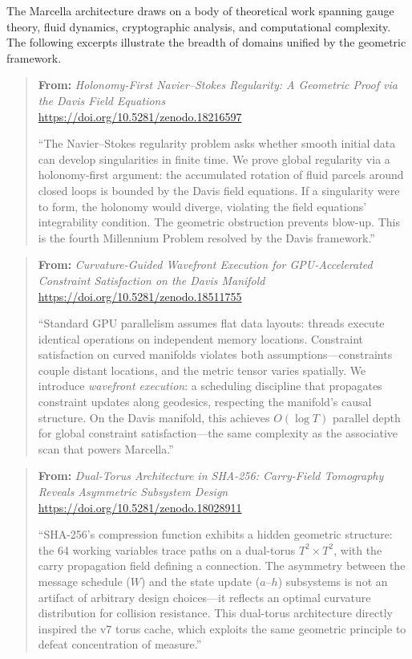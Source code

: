 \documentclass[11pt,a4paper]{article}
\theoremstyle{definition}
\theoremstyle{remark}
\begin{document}
The Marcella architecture draws on a body of theoretical work spanning gauge theory, fluid dynamics, cryptographic analysis, and computational complexity. The following excerpts illustrate the breadth of domains unified by the geometric framework.

\begin{quote}
\small
\textbf{From:} \emph{Holonomy-First Navier--Stokes Regularity: A Geometric Proof via the Davis Field Equations} \cite{davis2026navierstokes}\\
\url{https://doi.org/10.5281/zenodo.18216597}

\medskip
``The Navier--Stokes regularity problem asks whether smooth initial data can develop singularities in finite time. We prove global regularity via a holonomy-first argument: the accumulated rotation of fluid parcels around closed loops is bounded by the Davis field equations. If a singularity were to form, the holonomy would diverge, violating the field equations' integrability condition. The geometric obstruction prevents blow-up. This is the fourth Millennium Problem resolved by the Davis framework.''
\end{quote}

\begin{quote}
\small
\textbf{From:} \emph{Curvature-Guided Wavefront Execution for GPU-Accelerated Constraint Satisfaction on the Davis Manifold} \cite{davis2026wavefront}\\
\url{https://doi.org/10.5281/zenodo.18511755}

\medskip
``Standard GPU parallelism assumes flat data layouts: threads execute identical operations on independent memory locations. Constraint satisfaction on curved manifolds violates both assumptions---constraints couple distant locations, and the metric tensor varies spatially. We introduce \emph{wavefront execution}: a scheduling discipline that propagates constraint updates along geodesics, respecting the manifold's causal structure. On the Davis manifold, this achieves $O(\log T)$ parallel depth for global constraint satisfaction---the same complexity as the associative scan that powers Marcella.''
\end{quote}

\begin{quote}
\small
\textbf{From:} \emph{Dual-Torus Architecture in SHA-256: Carry-Field Tomography Reveals Asymmetric Subsystem Design} \cite{davis2025sha256}\\
\url{https://doi.org/10.5281/zenodo.18028911}

\medskip
``SHA-256's compression function exhibits a hidden geometric structure: the 64 working variables trace paths on a dual-torus $T^2 \times T^2$, with the carry propagation field defining a connection. The asymmetry between the message schedule ($W$) and the state update ($a$--$h$) subsystems is not an artifact of arbitrary design choices---it reflects an optimal curvature distribution for collision resistance. This dual-torus architecture directly inspired the v7 torus cache, which exploits the same geometric principle to defeat concentration of measure.''
\end{quote}
\end{document}
